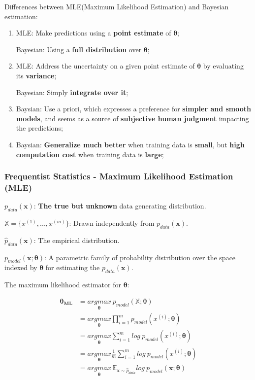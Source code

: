 \documentclass[12pt]{article}
\numberwithin{equation}{section}
\begin{document}
Differences between MLE(Maximum Likelihood Estimation) and Bayesian estimation:
\begin{enumerate}
	\item MLE: Make predictions using a \textbf{point estimate} of $\boldsymbol\theta$;
	
	Bayesian: Using a \textbf{full distribution} over $\boldsymbol\theta$;
	\item MLE: Address the uncertainty on a given point estimate of $\boldsymbol\theta$ by evaluating its \textbf{variance};
	
	Bayesian: Simply \textbf{integrate over it};
	\item Baysian: Use a priori, which expresses a preference for \textbf{simpler and smooth models}, and seems as a source of \textbf{subjective human judgment} impacting the predictions;
	\item Baysian: \textbf{Generalize much better} when training data is \textbf{small}, but \textbf{high computation cost} when training data is \textbf{large};
\end{enumerate}
\subsubsection{Frequentist Statistics - Maximum Likelihood Estimation (MLE)}
$p_{data}(\boldsymbol{x})$: \textbf{The true but unknown} data generating distribution.

 $\mathbb{X}=\{x^{(1)},...,x^{(m)}\}$: Drawn independently from $p_{data}(\boldsymbol{x})$.

$\hat{p}_{data}(\boldsymbol{x})$: The empirical distribution.

$p_{model}(\boldsymbol{x;\theta})$: A parametric family of probability distribution over the space indexed by $\boldsymbol{\theta}$ for estimating the $p_{data}(\boldsymbol{x})$.

The maximum likelihood estimator for $\boldsymbol{\theta}$:

\begin{align*}
\boldsymbol{\theta_{ML}}&=\underset{\boldsymbol{\theta}}{argmax}\ p_{model}({\mathbb{X};\boldsymbol{\theta}}) \\
&=\underset{\boldsymbol{\theta}}{argmax}\prod_{i=1}^{m}p_{model}(x^{(i)};\boldsymbol{\theta}) \\
&=\underset{\boldsymbol{\theta}}{argmax}\sum_{i=1}^{m}log\ p_{model}(x^{(i)};\boldsymbol{\theta}) \\
&=\underset{\boldsymbol{\theta}}{argmax}\frac{1}{m}\sum_{i=1}^{m}log\ p_{model}(x^{(i)};\boldsymbol{\theta}) \\
&=\underset{\boldsymbol{\theta}}{argmax}\ \mathbb{E}_{\boldsymbol{x}\sim\hat{p}_{data}}log\ p_{model}(\boldsymbol{x};\boldsymbol{\theta}) \\
\end{align*}
\end{document}
